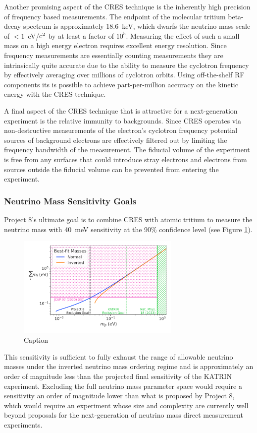 Another promising aspect of the CRES technique is the inherently high precision of frequency based measurements. The endpoint of the molecular tritium beta-decay spectrum is approximately 18.6~keV, which dwarfs the neutrino mass scale of $<1$~eV/$\rm{c}^2$ by at least a factor of $10^5$. Measuring the effect of such a small mass on a high energy electron requires excellent energy resolution. Since frequency measurements are essentially counting measurements they are intrinsically quite accurate due to the ability to measure the cyclotron frequency by effectively averaging over millions of cyclotron orbits. Using off-the-shelf RF components its is possible to achieve part-per-million accuracy on the kinetic energy with the CRES technique.

A final aspect of the CRES technique that is attractive for a next-generation experiment is the relative immunity to backgrounds. Since CRES operates via non-destructive measurements of the electron's cyclotron frequency potential sources of background electrons are effectively filtered out by limiting the frequency bandwidth of the measurement. The fiducial volume of the experiment is free from any surfaces that could introduce stray electrons and electrons from sources outside the fiducial volume can be prevented from entering the experiment.

\subsubsection*{Neutrino Mass Sensitivity Goals}

Project 8's ultimate goal is to combine CRES with atomic tritium to measure the neutrino mass with 40~meV sensitivity at the 90\% confidence level (see Figure \ref{fig:chap3-p8-nu-mass-goal}).
\begin{figure}[htbp]
    \centering
    \includegraphics[width=0.7\textwidth]{figs/Chapter-3/230303_sum_nu_mass_vs_m_beta_with_exclusion_and_goal.png}
    \caption{Caption}
    \label{fig:chap3-p8-nu-mass-goal}
\end{figure}
This sensitivity is sufficient to fully exhaust the range of allowable neutrino masses under the inverted neutrino mass ordering regime and is approximately an order of magnitude less than the projected final sensitivity of the KATRIN experiment. Excluding the full neutrino mass parameter space would require a sensitivity an order of magnitude lower than what is proposed by Project 8, which would require an experiment whose size and complexity are currently well beyond proposals for the next-generation of neutrino mass direct measurement experiments.

